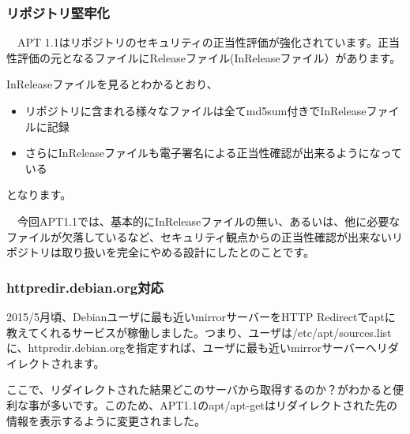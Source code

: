 \documentclass[mingoth,a4paper]{jsarticle}
\begin{document}
 \subsubsection{リポジトリ堅牢化}

　APT 1.1はリポジトリのセキュリティの正当性評価が強化されています。正当性評価の元となるファイルにReleaseファイル(InReleaseファイル）があります。

   
InReleaseファイルを見るとわかるとおり、

\begin{itemize}
\item リポジトリに含まれる様々なファイルは全てmd5sum付きでInReleaseファイルに記録
\item さらにInReleaseファイルも電子署名による正当性確認が出来るようになっている
\end{itemize}

となります。

　今回APT1.1では、基本的にInReleaseファイルの無い、あるいは、他に必要なファイルが欠落しているなど、セキュリティ観点からの正当性確認が出来ないリポジトリは取り扱いを完全にやめる設計にしたとのことです。

\subsubsection{httpredir.debian.org対応}

 2015/5月頃、Debianユーザに最も近いmirrorサーバーをHTTP Redirectでaptに教えてくれるサービスが稼働しました。つまり、ユーザは/etc/apt/sources.listに、httpredir.debian.orgを指定すれば、ユーザに最も近いmirrorサーバーへリダイレクトされます。

 ここで、リダイレクトされた結果どこのサーバから取得するのか？がわかると便利な事が多いです。このため、APT1.1のapt/apt-getはリダイレクトされた先の情報を表示するように変更されました。
\end{document}
